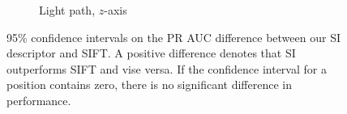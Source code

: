 \documentclass[thesis.tex]{subfiles}
\begin{document}
\begin{figure}[tb]
{\begin{subfigure}[t]{0.5618\textwidth}
		\caption{Light path, $z$-axis}
	\end{subfigure}
	}
	\caption{95\% confidence intervals on the PR AUC difference between our SI descriptor and SIFT. A positive difference denotes that SI outperforms SIFT and vise versa. If the confidence interval for a position contains zero, there is no significant difference in performance.}
	\label{fig:dtuResultsStatsSi_Sift}
\end{figure}

\subbibliography
\end{document}
